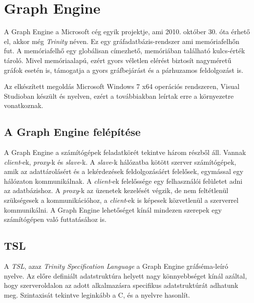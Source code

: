 \chapter{Graph Engine}

A Graph Engine a Microsoft cég egyik projektje, ami 2010. október 30. óta érhető el, akkor még \emph{Trinity} néven.\cite{MicrosoftTrinity} Ez egy gráfadatbázis-rendszer ami memóriafelhőn fut. A memóriafelhő egy globálisan címezhető, memóriában található kulcs-érték tároló. Mivel memóriaalapú, ezért gyors véletlen elérést biztosít nagyméretű gráfok esetén is, támogatja a gyors gráfbejárást és a párhuzamos feldolgozást is.\cite{Trinity}

Az elkészített megoldás Microsoft Windows 7 x64 operációs rendszeren, Visual Studioban készült és \Csh{} nyelven, ezért a továbbiakban leírtak erre a környezetre vonatkoznak.


\section{A Graph Engine felépítése}

A Graph Engine a számítógépek feladatkörét tekintve három részből áll. Vannak \emph{client}-ek, \emph{proxy}-k és \emph{slave}-k. A \emph{slave}-k hálózatba kötött szerver számítógépek, amik az adattárolásért és a lekérdezések feldolgozásáért felelősek, egymással egy hálózaton kommunikálnak. A \emph{client}-ek felelőssége egy felhasználói felületet adni az adatbázishoz. A \emph{proxy}-k az üzenetek kezelését végzik, de nem feltétlenül szükségesek a kommunikációhoz, a \emph{client}-ek is képesek közvetlenül a szerverrel kommunikálni. A Graph Engine lehetőséget kínál mindezen szerepek egy számítógépen való futtatásához is.


\section{TSL}

A \emph{TSL}, azaz \emph{Trinity Specification Language} a Graph Engine gráfséma-leíró nyelve. Az előre definiált adatstruktúra helyett nagy könnyebbséget kínál azáltal, hogy szerveroldalon az adott alkalmazásra specifikus adatstruktúrát adhatunk meg. Szintaxisát tekintve leginkább a C, \cpp{}  és a \Csh{} nyelvre hasonlít.

